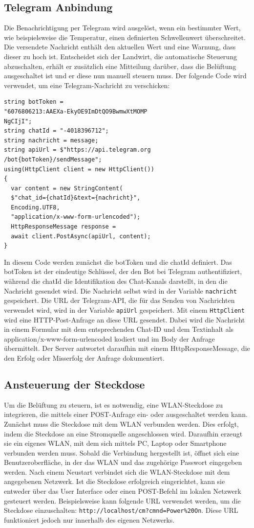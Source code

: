 \documentclass[conference]{IEEEtran}
\begin{document}
\subsection{Telegram Anbindung}
Die Benachrichtigung per Telegram wird ausgelöst, wenn ein bestimmter Wert, wie beispielsweise die Temperatur, einen definierten Schwellenwert überschreitet. Die versendete Nachricht enthält den aktuellen Wert und eine Warnung, dass dieser zu hoch ist. Entscheidet sich der Landwirt, die automatische Steuerung abzuschalten, erhält er zusätzlich eine Mitteilung darüber, dass die Belüftung ausgeschaltet ist und er diese nun manuell steuern muss.
Der folgende Code wird verwendet, um eine Telegram-Nachricht zu verschicken:
\begin{verbatim}
string botToken = 
"6076806213:AAEXa-EkyOE9ImDtQO9BwmwXtMOMP
NgCIjI";
string chatId = "-4018396712";
string nachricht = message;
string apiUrl = $"https://api.telegram.org
/bot{botToken}/sendMessage";
using(HttpClient client = new HttpClient())
{
  var content = new StringContent(
  $"chat_id={chatId}&text={nachricht}", 
  Encoding.UTF8, 
  "application/x-www-form-urlencoded");
  HttpResponseMessage response = 
  await client.PostAsync(apiUrl, content);
}
\end{verbatim}
In diesem Code werden zunächst die botToken und die chatId definiert. Das botToken ist der eindeutige Schlüssel, der den Bot bei Telegram authentifiziert, während die chatId die Identifikation des Chat-Kanals darstellt, in den die Nachricht gesendet wird. Die Nachricht selbst wird in der Variable \texttt{nachricht} gespeichert.
Die URL der Telegram-API, die für das Senden von Nachrichten verwendet wird, wird in der Variable \texttt{apiUrl} gespeichert. Mit einem \texttt{HttpClient} wird eine HTTP-Post-Anfrage an diese URL gesendet. Dabei wird die Nachricht in einem Formular mit dem entsprechenden Chat-ID und dem Textinhalt als application/x-www-form-urlencoded kodiert und im Body der Anfrage übermittelt. Der Server antwortet daraufhin mit einem HttpResponseMessage, die den Erfolg oder Misserfolg der Anfrage dokumentiert.


\subsection{Ansteuerung der Steckdose}
Um die Belüftung zu steuern, ist es notwendig, eine WLAN-Steckdose zu integrieren, die mittels einer POST-Anfrage ein- oder ausgeschaltet werden kann. Zunächst muss die Steckdose mit dem WLAN verbunden werden. Dies erfolgt, indem die Steckdose an eine Stromquelle angeschlossen wird. Daraufhin erzeugt sie ein eigenes WLAN, mit dem sich mittels PC, Laptop oder Smartphone verbunden werden muss. Sobald die Verbindung hergestellt ist, öffnet sich eine Benutzeroberfläche, in der das WLAN und das zugehörige Passwort eingegeben werden. Nach einem Neustart verbindet sich die WLAN-Steckdose mit dem angegebenen Netzwerk.
Ist die Steckdose erfolgreich eingerichtet, kann sie entweder über das User Interface oder einen POST-Befehl im lokalen Netzwerk gesteuert werden. Beispielsweise kann folgende URL verwendet werden, um die Steckdose einzuschalten: \texttt{http://localhost/cm?cmnd=Power\%20On}. Diese URL funktioniert jedoch nur innerhalb des eigenen Netzwerks.
\end{document}
